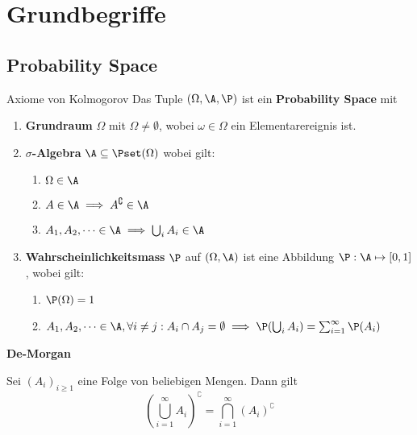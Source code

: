 \section{Grundbegriffe}
\subsection{Probability Space}
\begin{mainbox}{Axiome von Kolmogorov}
    Das Tuple $(\Omega, \A, \P)$ ist ein \textbf{Probability Space} mit 
    \begin{enumerate}[label=\Roman*.]
        \item \textbf{Grundraum} $\Omega$ mit $\Omega \neq \emptyset$, wobei $\omega \in \Omega$ ein Elementarereignis ist.
        \item \textbf{$\sigma$-Algebra} $\A \subseteq \Pset(\Omega)$ wobei gilt:
        \begin{enumerate}[label=\arabic*.]
            \item $\Omega \in \A$
            \item $A \in \A \implies A^\complement \in \A$
            \item $A_1,A_2,\dots \in \A \implies \bigcup_i A_i \in \A$
        \end{enumerate}
        \item \textbf{Wahrscheinlichkeitsmass} $\P$ auf $(\Omega, \A)$ ist eine Abbildung $\P: \A \mapsto [0,1]$, wobei gilt:
        \begin{enumerate}[label=\arabic*.]
            \item $\P(\Omega) = 1$
            \item $A_1, A_2, \dots \in \A, \forall i \neq j: A_i \cap A_j = \emptyset \\ \implies \P(\bigcup_i A_i) = \sum_{i= 1}^\infty \P(A_i)$
        \end{enumerate}
    \end{enumerate}
\end{mainbox}

\textbf{De-Morgan}
    
Sei $(A_i)_{i \geq 1}$ eine Folge von beliebigen Mengen. Dann gilt
    $$\left(\bigcup_{i = 1}^{\infty}A_i\right)^\complement = \bigcap_{i = 1}^{\infty} (A_i)^\complement$$


